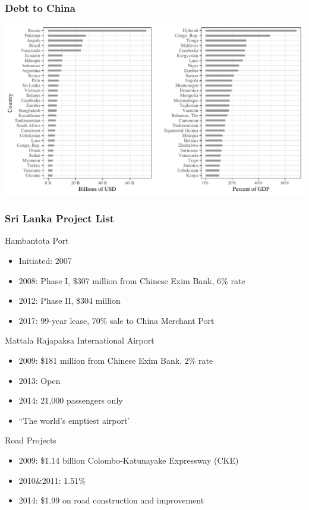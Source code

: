 \documentclass[mathserif]{beamer}
\begin{document}
    \begin{frame}
        \frametitle{Debt to China}
            \includegraphics[width = \textwidth]{fig/debt-level-by-country.pdf}
    \end{frame}

    \begin{frame}
        \frametitle{Sri Lanka Project List}
        Hambantota Port
        \begin{itemize}
            \item Initiated: 2007
            \item 2008: Phase I, \$307 million from Chinese Exim Bank, 6\% rate
            \item 2012: Phase II, \$304 million
            \item 2017: 99-year lease, 70\% sale to China Merchant Port
        \end{itemize}
        \vfill
        Mattala Rajapaksa International Airport
        \begin{itemize}
            \item 2009: \$181 million from Chinese Exim Bank, 2\% rate
            \item 2013: Open
            \item 2014: 21,000 passengers only
            \item ``The world's emptiest airport'
        \end{itemize}
        \vfill
        Road Projects
        \begin{itemize}
            \item 2009: \$1.14 billion Colombo-Katunayake Expressway (CKE)
            \item 2010\&2011: 1.51\%
            \item 2014: \$1.99 on road construction and improvement
        \end{itemize}
    \end{frame}
\end{document}

